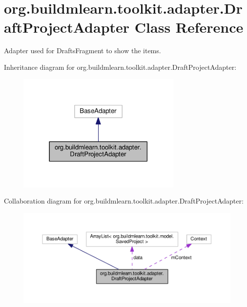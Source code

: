 \hypertarget{classorg_1_1buildmlearn_1_1toolkit_1_1adapter_1_1DraftProjectAdapter}{}\section{org.\+buildmlearn.\+toolkit.\+adapter.\+Draft\+Project\+Adapter Class Reference}
\label{classorg_1_1buildmlearn_1_1toolkit_1_1adapter_1_1DraftProjectAdapter}


Adapter used for Drafts\+Fragment to show the items.  




Inheritance diagram for org.\+buildmlearn.\+toolkit.\+adapter.\+Draft\+Project\+Adapter\+:
\nopagebreak
\begin{figure}[H]
\begin{center}
\leavevmode
\includegraphics[width=230pt]{classorg_1_1buildmlearn_1_1toolkit_1_1adapter_1_1DraftProjectAdapter__inherit__graph}
\end{center}
\end{figure}


Collaboration diagram for org.\+buildmlearn.\+toolkit.\+adapter.\+Draft\+Project\+Adapter\+:
\nopagebreak
\begin{figure}[H]
\begin{center}
\leavevmode
\includegraphics[width=350pt]{classorg_1_1buildmlearn_1_1toolkit_1_1adapter_1_1DraftProjectAdapter__coll__graph}
\end{center}
\end{figure}
